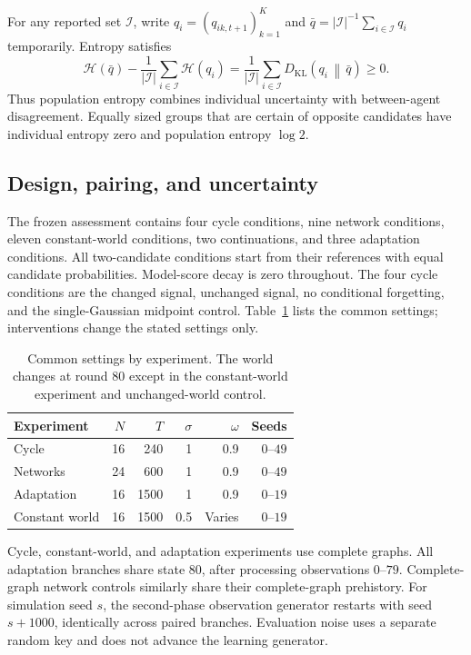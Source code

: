 \documentclass[runningheads]{llncs}
\newcommand{\KL}[2]{D_{\mathrm{KL}}\!\left(#1\,\middle\|\,#2\right)}
\begin{document}
For any reported set $\mathcal I$, write $q_i=(q_{ik,t+1})_{k=1}^K$ and
$\bar q=|\mathcal I|^{-1}\sum_{i\in\mathcal I}q_i$ temporarily. Entropy satisfies
\begin{equation}
 \mathcal H(\bar q)-\frac1{|\mathcal I|}\sum_{i\in\mathcal I}\mathcal H(q_i)
     =\frac1{|\mathcal I|}\sum_{i\in\mathcal I}\KL{q_i}{\bar q}\geq0.
 \label{eq:entropy-decomposition}
\end{equation}
Thus population entropy combines individual uncertainty with between-agent
disagreement. Equally sized groups that are certain of opposite candidates
have individual entropy zero and population entropy $\log2$.

\subsection{Design, pairing, and uncertainty}
\label{app:design}
The frozen assessment contains four cycle conditions, nine network conditions,
eleven constant-world conditions, two continuations, and three adaptation
conditions. All two-candidate conditions start from their references with equal
candidate probabilities. Model-score decay is zero throughout. The four cycle
conditions are the changed signal, unchanged signal, no conditional forgetting,
and the single-Gaussian midpoint control. Table~\ref{tab:settings} lists the
common settings; interventions change the stated settings only.

\begin{table}[!htbp]
 \centering\small
 \caption{Common settings by experiment. The world changes at round 80 except
 in the constant-world experiment and unchanged-world control.}
 \label{tab:settings}
 \begin{tabular}{@{}lrrrrr@{}}
 \toprule
 Experiment & $N$ & $T$ & $\sigma$ & $\omega$ & Seeds\\
 \midrule
 Cycle &16&240&1&0.9&$0$--$49$\\
 Networks &24&600&1&0.9&$0$--$49$\\
 Adaptation &16&1500&1&0.9&$0$--$19$\\
 Constant world &16&1500&0.5&Varies&$0$--$19$\\
 \bottomrule
 \end{tabular}
\end{table}

Cycle, constant-world, and adaptation experiments use complete graphs.
All adaptation branches share state 80, after processing observations
$0$--$79$. Complete-graph network controls similarly share their complete-graph
prehistory. For simulation seed $s$, the second-phase observation generator
restarts with seed $s+1000$, identically across paired branches. Evaluation
noise uses a separate random key and does not advance the learning generator.
\end{document}
